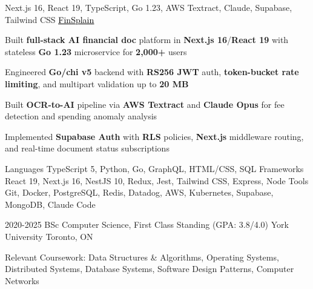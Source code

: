 \documentclass[11pt, a4paper]{awesome-cv}
\begin{document}
\begin{cventries}
\end{cventries}


\begin{cventries}
  \cventry
  {Next.js 16, React 19, TypeScript, Go 1.23, AWS Textract, Claude, Supabase, Tailwind CSS}
  {\href{https://finsplain.net}{\textcolor{black}{\underline{FinSplain}} \faExternalLink}}
  {}
  {}
  {
    \begin{cvitems}
      \item {Built \textbf{full-stack AI financial doc} platform in \textbf{Next.js 16}/\textbf{React 19} with stateless \textbf{Go 1.23} microservice for \textbf{2,000+} users}
      \item {Engineered \textbf{Go/chi v5} backend with \textbf{RS256 JWT} auth, \textbf{token-bucket rate limiting}, and multipart validation up to \textbf{20 MB}}
      \item {Built \textbf{OCR-to-AI} pipeline via \textbf{AWS Textract} and \textbf{Claude Opus} for fee detection and spending anomaly analysis}
      \item {Implemented \textbf{Supabase Auth} with \textbf{RLS} policies, \textbf{Next.js} middleware routing, and real-time document status subscriptions}
    \end{cvitems}
  }
\end{cventries}


\begin{cvskills}
  \cvskill
  {Languages}
  {TypeScript 5, Python, Go, GraphQL, HTML/CSS, SQL}
  \cvskill
  {Frameworks}
  {React 19, Next.js 16, NestJS 10, Redux, Jest, Tailwind CSS, Express, Node}
  \cvskill
  {Tools}
  {Git, Docker, PostgreSQL, Redis, Datadog, AWS, Kubernetes, Supabase, MongoDB, Claude Code}
\end{cvskills}

\vspace{-2mm}

\begin{cventries}
  \cventry
  {2020-2025}
  {BSc Computer Science, First Class Standing (GPA: 3.8/4.0)}
  {York University}
  {Toronto, ON}
  {%
    \begin{cvitems}
      \item {Relevant Coursework: Data Structures \& Algorithms, Operating Systems, Distributed Systems, Database Systems, Software Design Patterns, Computer Networks}
    \end{cvitems}
  }
\end{cventries}
\end{document}
